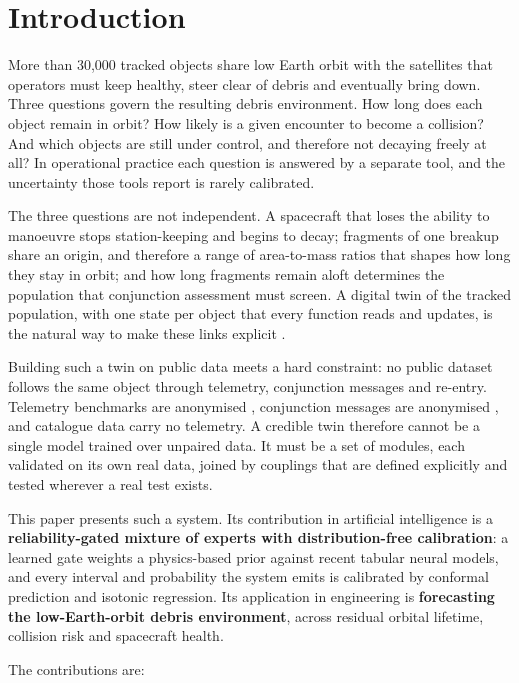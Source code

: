 \documentclass[3p,times]{elsarticle}
\begin{document}
\section{Introduction}\label{sec:intro}

More than 30,000 tracked objects share low Earth orbit with the
satellites that operators must keep healthy, steer clear of debris and
eventually bring down. Three questions govern the resulting debris
environment. How long does each object remain in orbit? How likely is a
given encounter to become a collision? And which objects are still under
control, and therefore not decaying freely at all? In operational
practice each question is answered by a separate tool, and the
uncertainty those tools report is rarely calibrated.

The three questions are not independent. A spacecraft that loses the
ability to manoeuvre stops station-keeping and begins to decay;
fragments of one breakup share an origin, and therefore a range of
area-to-mass ratios that shapes how long they stay in orbit; and how
long fragments remain aloft determines the population that conjunction
assessment must screen. A digital twin of the tracked population, with
one state per object that every function reads and updates, is the
natural way to make these links explicit \citep{liu2024digital}.

Building such a twin on public data meets a hard constraint: no public
dataset follows the same object through telemetry, conjunction messages
and re-entry. Telemetry benchmarks are anonymised
\citep{kotowski2026esaadb, hundman2018}, conjunction messages are
anonymised \citep{uriot2022spacecraft}, and catalogue data carry no
telemetry. A credible twin therefore cannot be a single model trained
over unpaired data. It must be a set of modules, each validated on its
own real data, joined by couplings that are defined explicitly and
tested wherever a real test exists.

This paper presents such a system. Its contribution in artificial
intelligence is a \textbf{reliability-gated mixture of experts with
distribution-free calibration}: a learned gate weights a physics-based
prior against recent tabular neural models, and every interval and
probability the system emits is calibrated by conformal prediction and
isotonic regression. Its application in engineering is
\textbf{forecasting the low-Earth-orbit debris environment}, across
residual orbital lifetime, collision risk and spacecraft health.

The contributions are:
\end{document}
